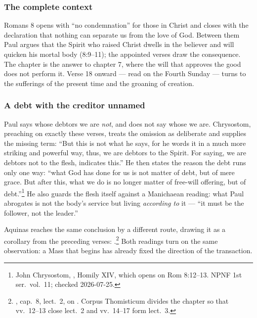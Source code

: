 \subsubsection*{The complete context}

Romans 8 opens with ``no condemnation'' for those in Christ and closes with the
declaration that nothing can separate us from the love of God. Between them
Paul argues that the Spirit who raised Christ dwells in the believer and will
quicken his mortal body (8:9--11); the appointed verses draw the consequence.
The chapter is the answer to chapter 7, where the will that approves the good
does not perform it. Verse 18 onward --- read on the Fourth Sunday --- turns to
the sufferings of the present time and the groaning of creation.

\subsubsection*{A debt with the creditor unnamed}

 Paul says whose debtors we are \emph{not},
and does not say whose we are. Chrysostom, preaching on exactly these verses,
treats the omission as deliberate and supplies the missing term: ``But this is
not what he says, for he words it in a much more striking and powerful way,
thus, we are debtors to the Spirit. For saying, we are debtors not to the
flesh, indicates this.'' He then states the reason the debt runs only one way:
``what God has done for us is not matter of debt, but of mere grace. But after
this, what we do is no longer matter of free-will offering, but of
debt.''\footnote{John Chrysostom, , Homily XIV, which opens on Rom 8:12--13. NPNF 1st ser.\ vol.\ 11;
checked 2026-07-25.} He also guards the flesh itself against a Manichaean
reading: what Paul abrogates is not the body's service but living
\emph{according to} it --- ``it must be the follower, not the leader.''

Aquinas reaches the same conclusion by a different route, drawing it as a
corollary from the preceding verses: .\footnote{, cap.\ 8, lect.\ 2, on
. Corpus Thomisticum divides the chapter so that vv.\
12--13 close lect.\ 2 and vv.\ 14--17 form lect.\ 3.} Both readings turn on the
same observation: a Mass that begins \latin{suscépimus} has already fixed the
direction of the transaction.


